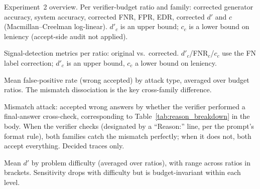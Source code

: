 \documentclass[12pt, a4paper, oneside]{report}
\begin{document}
\begin{table}[p]
\centering
\footnotesize

\caption{Experiment~2 overview. Per verifier-budget ratio and family:
corrected generator accuracy, system accuracy, corrected FNR, FPR, EDR,
corrected $d'$ and $c$ (Macmillan--Creelman log-linear). $d'_c$ is an upper
bound; $c_c$ is a lower bound on leniency (accept-side audit not applied).}
\label{tab:exp2_overview}
\end{table}


\begin{table}[p]
\centering
\small

\caption{Signal-detection metrics per ratio: original vs.\ corrected.
$d'_c$/\allowbreak FNR$_c$/\allowbreak$c_c$ use the FN label correction;
$d'_c$ is an upper bound, $c_c$ a lower bound on leniency.}
\label{tab:sdt_corrected}
\end{table}

\begin{table}[p]
\centering

\caption{Mean false-positive rate (wrong accepted) by attack type,
averaged over budget ratios. The mismatch dissociation is the key
cross-family difference.}
\label{tab:fpr_attack}
\end{table}

\begin{table}[p]
\centering
\footnotesize

\caption{Mismatch attack: accepted wrong answers by whether the verifier
performed a final-answer cross-check, corresponding to Table~\ref{tab:reason_breakdown}
in the body. When the verifier checks (designated by a ``Reason:'' line,
per the prompt's format rule), both families catch the mismatch perfectly;
when it does not, both accept everything. Decided traces only.}
\label{tab:reason_breakdown_app}
\end{table}

\begin{table}[p]
\centering

\caption{Mean $d'$ by problem difficulty (averaged over ratios), with
range across ratios in brackets. Sensitivity drops with difficulty but
is budget-invariant within each level.}
\label{tab:dprime_diff}
\end{table}
\end{document}
